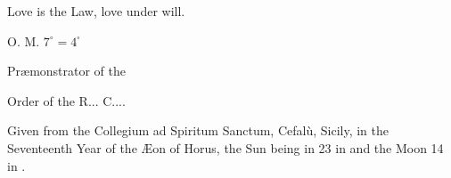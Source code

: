 Love is the Law, love under will.

{\raggedleft
O. M. $7^{\circ} = 4^{\square}$ \Argentium{}

Pr\ae{}monstrator of the

Order of the R... C....
\par}

Given from the Collegium ad Spiritum Sanctum, Cefal\`{u}, Sicily, in the Seventeenth Year of the \AE{}on of Horus, the Sun being in 23\textdegree{} in \virgo{} and the Moon 14\textdegree{} in \pisces{}.

